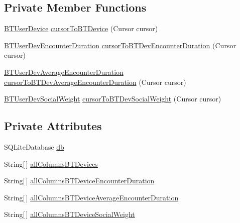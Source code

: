 \subsection*{Private Member Functions}
\begin{DoxyCompactItemize}
\item 
\hyperlink{classcom_1_1social_1_1proximity_1_1_b_t_user_device}{B\+T\+User\+Device} \hyperlink{classcom_1_1social_1_1proximity_1_1_database_functions_a8d5062709948e54d224ac1b65637e4fc}{cursor\+To\+B\+T\+Device} (Cursor cursor)
\item 
\hyperlink{classcom_1_1social_1_1proximity_1_1_b_t_user_dev_encounter_duration}{B\+T\+User\+Dev\+Encounter\+Duration} \hyperlink{classcom_1_1social_1_1proximity_1_1_database_functions_a405dbb37f14ca70e94b8ecad32d323f1}{cursor\+To\+B\+T\+Dev\+Encounter\+Duration} (Cursor cursor)
\item 
\hyperlink{classcom_1_1social_1_1proximity_1_1_b_t_user_dev_average_encounter_duration}{B\+T\+User\+Dev\+Average\+Encounter\+Duration} \hyperlink{classcom_1_1social_1_1proximity_1_1_database_functions_a80ba14678e2170e8798f1412fccec08a}{cursor\+To\+B\+T\+Dev\+Average\+Encounter\+Duration} (Cursor cursor)
\item 
\hyperlink{classcom_1_1social_1_1proximity_1_1_b_t_user_dev_social_weight}{B\+T\+User\+Dev\+Social\+Weight} \hyperlink{classcom_1_1social_1_1proximity_1_1_database_functions_ab76111ebce8e97043be7975514a8dec4}{cursor\+To\+B\+T\+Dev\+Social\+Weight} (Cursor cursor)
\end{DoxyCompactItemize}
\subsection*{Private Attributes}
\begin{DoxyCompactItemize}
\item 
S\+Q\+Lite\+Database \hyperlink{classcom_1_1social_1_1proximity_1_1_database_functions_a6b12c0a8d4be24df06fbc5117840e2e1}{db}
\item 
String\mbox{[}$\,$\mbox{]} \hyperlink{classcom_1_1social_1_1proximity_1_1_database_functions_a83354aec2042f330c23bde5edf553129}{all\+Columns\+B\+T\+Devices}
\item 
String\mbox{[}$\,$\mbox{]} \hyperlink{classcom_1_1social_1_1proximity_1_1_database_functions_ab59f771fe031574737a9c5a9487d2540}{all\+Columns\+B\+T\+Device\+Encounter\+Duration}
\item 
String\mbox{[}$\,$\mbox{]} \hyperlink{classcom_1_1social_1_1proximity_1_1_database_functions_a37740a5005b0a87d33dc3f25f7433474}{all\+Columns\+B\+T\+Device\+Average\+Encounter\+Duration}
\item 
String\mbox{[}$\,$\mbox{]} \hyperlink{classcom_1_1social_1_1proximity_1_1_database_functions_a5cb0795326bc5712e498557e68a2f3e7}{all\+Columns\+B\+T\+Device\+Social\+Weight}
\end{DoxyCompactItemize}


